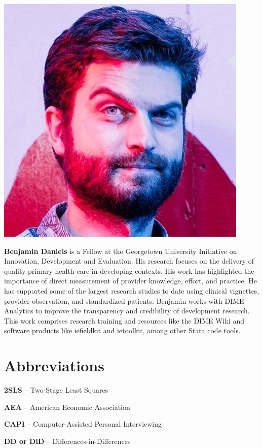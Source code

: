 \documentclass[
]{book}
\begin{document}
\includegraphics{author-bios/ben-pic.jpg}

\textbf{Benjamin Daniels} is a Fellow at the Georgetown University Initiative on Innovation, Development and Evaluation. His research focuses on the delivery of quality primary health care in developing contexts. His work has highlighted the importance of direct measurement of provider knowledge, effort, and practice. He has supported some of the largest research studies to date using clinical vignettes, provider observation, and standardized patients. Benjamin works with DIME Analytics to improve the transparency and credibility of development research. This work comprises research training and resources like the DIME Wiki and software products like iefieldkit and ietoolkit, among other Stata code tools.

\hypertarget{abbreviations}{%
\chapter*{Abbreviations}\label{abbreviations}}

\textbf{2SLS} -- Two-Stage Least Squares

\textbf{AEA} -- American Economic Association

\textbf{CAPI} -- Computer-Assisted Personal Interviewing

\textbf{DD or DiD} -- Differences-in-Differences
\end{document}
